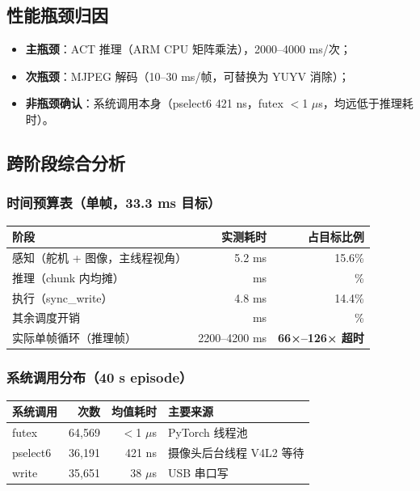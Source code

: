 \subsection{性能瓶颈归因}
\begin{itemize}[leftmargin=2em]
  \item \textbf{主瓶颈}：ACT 推理（ARM CPU 矩阵乘法），2000--4000 ms/次；
  \item \textbf{次瓶颈}：MJPEG 解码（10--30 ms/帧，可替换为 YUYV 消除）；
  \item \textbf{非瓶颈确认}：系统调用本身（pselect6 421 ns，futex $<$1 $\mu$s，均远低于推理耗时）。
\end{itemize}

\subsection{跨阶段综合分析}

\subsubsection{时间预算表（单帧，33.3 ms 目标）}

\begin{center}
\begin{tabular}{lrr}
  \toprule
  阶段 & 实测耗时 & 占目标比例 \\
  \midrule
  感知（舵机 + 图像，主线程视角） & 5.2 ms & 15.6\% \\
  推理（chunk 内均摊） & \mytodo{} ms & \mytodo{}\% \\
  执行（sync\_write） & 4.8 ms & 14.4\% \\
  其余调度开销 & \mytodo{} ms & \mytodo{}\% \\
  \midrule
  实际单帧循环（推理帧） & 2200--4200 ms & \textbf{66×--126× 超时} \\
  \bottomrule
\end{tabular}
\end{center}

\subsubsection{系统调用分布（40 s episode）}

\begin{center}
\begin{tabular}{lrrl}
  \toprule
  系统调用 & 次数 & 均值耗时 & 主要来源 \\
  \midrule
  futex    & 64,569 & $<$1 $\mu$s & PyTorch 线程池 \\
  pselect6 & 36,191 & 421 ns & 摄像头后台线程 V4L2 等待 \\
  write    & 35,651 & 38 $\mu$s & USB 串口写 \\
  \bottomrule
\end{tabular}
\end{center}

